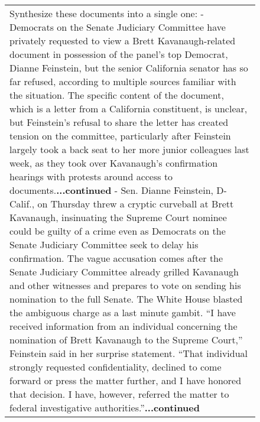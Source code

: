 \begin{figure}[h]
\centering
\begin{tabular}{p{}}
\cellcolor{oldlace} Synthesize these documents into a single one:\vspace{1pt} \newline \vspace{1pt} \newline \vspace{1pt} \newline - Democrats on the Senate Judiciary Committee have privately requested to view a Brett Kavanaugh-related document in possession of the panel’s top Democrat, Dianne Feinstein, but the senior California senator has so far refused, according to multiple sources familiar with the situation. The specific content of the document, which is a letter from a California constituent, is unclear, but Feinstein’s refusal to share the letter has created tension on the committee, particularly after Feinstein largely took a back seat to her more junior colleagues last week, as they took over Kavanaugh’s confirmation hearings with protests around access to documents.\textbf{...continued} 
\vspace{1pt} \newline \vspace{1pt} \newline \vspace{1pt} \newline -  Sen. Dianne Feinstein, D-Calif., on Thursday threw a cryptic curveball at Brett Kavanaugh, insinuating the Supreme Court nominee could be guilty of a crime even as Democrats on the Senate Judiciary Committee seek to delay his confirmation. \vspace{1pt} \newline  \vspace{1pt} \newline  The vague accusation comes after the Senate Judiciary Committee already grilled Kavanaugh and other witnesses and prepares to vote on sending his nomination to the full Senate. The White House blasted the ambiguous charge as a last minute gambit. \vspace{1pt} \newline  \vspace{1pt} \newline  “I have received information from an individual concerning the nomination of Brett Kavanaugh to the Supreme Court,” Feinstein said in her surprise statement. “That individual strongly requested confidentiality, declined to come forward or press the matter further, and I have honored that decision. I have, however, referred the matter to federal investigative authorities.”\textbf{...continued}

\end{tabular}
\end{figure}
